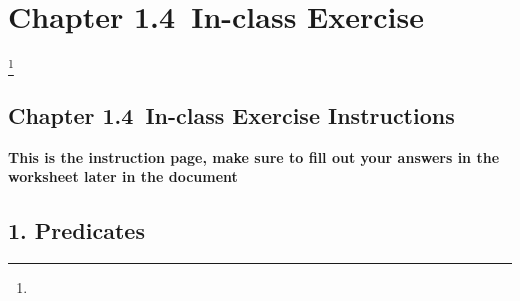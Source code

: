 \documentclass[a4paper,12pt]{book}
\title{}
\author{Rachel Morris}
\date{\today}
\newcommand{\laChapter}{1.4\ }
\begin{document}
    \toggletrue{answerkey}


    \chapter*{Chapter \laChapter In-class Exercise} 
    \footnote{
        \iftoggle{answerkey}{
          \begin{answer} ANSWER KEY \end{answer}
        }{}
    }

    \begin{center} \section*{Chapter \laChapter In-class Exercise Instructions} \end{center}

    \begin{center}
        \textbf{This is the instruction page,
        make sure to fill out your answers in the worksheet later in the document}
    \end{center}

    \section*{1. Predicates}
\end{document}

